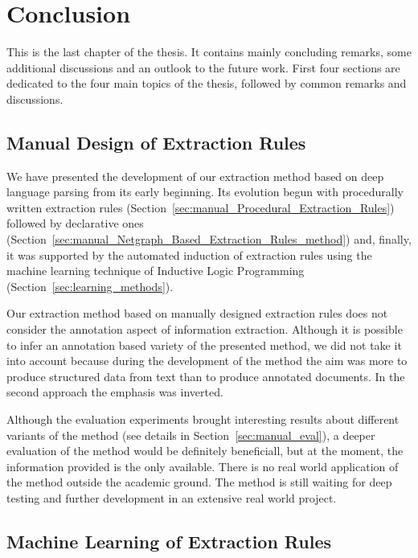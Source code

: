 \chapter{Conclusion} \label{sec:ch_conclusion}

This is the last chapter of the thesis. It contains mainly concluding remarks, some additional discussions and an outlook to the future work. First four sections are dedicated to the four main topics of the thesis, followed by common remarks and discussions. 



\section{Manual Design of Extraction Rules}
We have presented the development of our extraction method based on deep language parsing from its early beginning. Its evolution begun with procedurally written extraction rules (Section~\ref{sec:manual_Procedural_Extraction_Rules}) followed by declarative ones (Section~\ref{sec:manual_Netgraph_Based_Extraction_Rules_method}) and, finally, it was supported by the automated induction of extraction rules using the machine learning technique of Inductive Logic Programming (Section~\ref{sec:learning_methods}).


Our extraction method based on manually designed extraction rules does not consider the annotation aspect of information extraction. Although it is possible to infer an annotation based variety of the presented method, we did not take it into account because during the development of the method the aim was more to produce structured data from text than to produce annotated documents. In the second approach the emphasis was inverted. 

Although the evaluation experiments brought interesting results about different variants of the method (see details in Section~\ref{sec:manual_eval}), a deeper evaluation of the method would be definitely beneficiall, but at the moment, the information provided is the only available. There is no real world application of the method outside the academic ground. The method is still waiting for deep testing and further development in an extensive real world project.



\section{Machine Learning of Extraction Rules}

